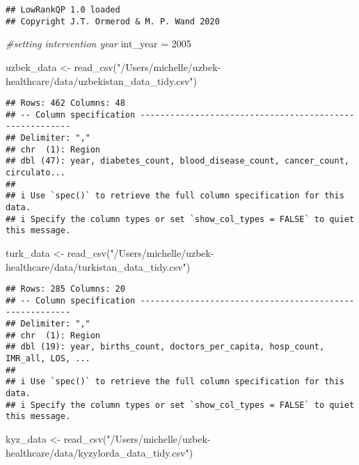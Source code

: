 \documentclass[
]{article}
\newenvironment{Shaded}{\begin{snugshade}}{\end{snugshade}}
\newcommand{\CommentTok}[1]{\textcolor[rgb]{0.56,0.35,0.01}{\textit{#1}}}
\newcommand{\DecValTok}[1]{\textcolor[rgb]{0.00,0.00,0.81}{#1}}
\newcommand{\FunctionTok}[1]{\textcolor[rgb]{0.00,0.00,0.00}{#1}}
\newcommand{\NormalTok}[1]{#1}
\newcommand{\OtherTok}[1]{\textcolor[rgb]{0.56,0.35,0.01}{#1}}
\newcommand{\StringTok}[1]{\textcolor[rgb]{0.31,0.60,0.02}{#1}}
\begin{document}
\begin{verbatim}
## LowRankQP 1.0 loaded
## Copyright J.T. Ormerod & M. P. Wand 2020
\end{verbatim}

\begin{Shaded}
\begin{Highlighting}[]
\CommentTok{\#setting intervention year}
\NormalTok{int\_year }\OtherTok{=} \DecValTok{2005}

\NormalTok{uzbek\_data }\OtherTok{\textless{}{-}} \FunctionTok{read\_csv}\NormalTok{(}\StringTok{"/Users/michelle/uzbek{-}healthcare/data/uzbekistan\_data\_tidy.csv"}\NormalTok{)}
\end{Highlighting}
\end{Shaded}

\begin{verbatim}
## Rows: 462 Columns: 48
## -- Column specification --------------------------------------------------------
## Delimiter: ","
## chr  (1): Region
## dbl (47): year, diabetes_count, blood_disease_count, cancer_count, circulato...
## 
## i Use `spec()` to retrieve the full column specification for this data.
## i Specify the column types or set `show_col_types = FALSE` to quiet this message.
\end{verbatim}

\begin{Shaded}
\begin{Highlighting}[]
\NormalTok{turk\_data }\OtherTok{\textless{}{-}} \FunctionTok{read\_csv}\NormalTok{(}\StringTok{"/Users/michelle/uzbek{-}healthcare/data/turkistan\_data\_tidy.csv"}\NormalTok{)}
\end{Highlighting}
\end{Shaded}

\begin{verbatim}
## Rows: 285 Columns: 20
## -- Column specification --------------------------------------------------------
## Delimiter: ","
## chr  (1): Region
## dbl (19): year, births_count, doctors_per_capita, hosp_count, IMR_all, LOS, ...
## 
## i Use `spec()` to retrieve the full column specification for this data.
## i Specify the column types or set `show_col_types = FALSE` to quiet this message.
\end{verbatim}

\begin{Shaded}
\begin{Highlighting}[]
\NormalTok{kyz\_data }\OtherTok{\textless{}{-}} \FunctionTok{read\_csv}\NormalTok{(}\StringTok{"/Users/michelle/uzbek{-}healthcare/data/kyzylorda\_data\_tidy.csv"}\NormalTok{)}
\end{Highlighting}
\end{Shaded}
\end{document}
